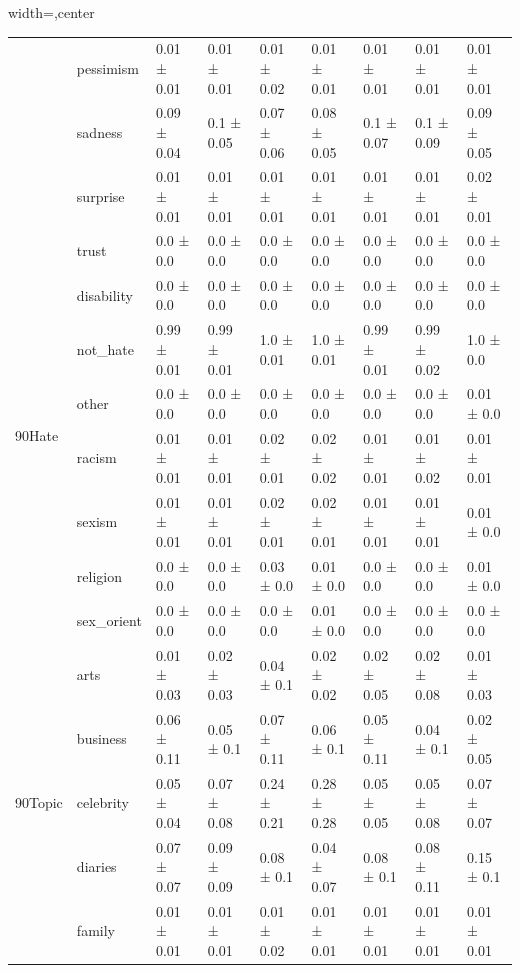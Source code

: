 \begin{table}
\begin{adjustbox}{width=\textwidth,center}
\begin{tabular}{llll|ll|ll|l}
 & pessimism & 0.01 ± 0.01 & 0.01 ± 0.01 & 0.01 ± 0.02 & 0.01 ± 0.01 & 0.01 ± 0.01 & 0.01 ± 0.01 & 0.01 ± 0.01 \\
 & sadness & 0.09 ± 0.04 & 0.1 ± 0.05 & 0.07 ± 0.06 & 0.08 ± 0.05 & 0.1 ± 0.07 & 0.1 ± 0.09 & 0.09 ± 0.05 \\
 & surprise & 0.01 ± 0.01 & 0.01 ± 0.01 & 0.01 ± 0.01 & 0.01 ± 0.01 & 0.01 ± 0.01 & 0.01 ± 0.01 & 0.02 ± 0.01 \\
 & trust & 0.0 ± 0.0 & 0.0 ± 0.0 & 0.0 ± 0.0 & 0.0 ± 0.0 & 0.0 ± 0.0 & 0.0 ± 0.0 & 0.0 ± 0.0 \\ \hline
\multirow{6}{*}{\begin{turn}{90}Hate\end{turn}} & disability & 0.0 ± 0.0 & 0.0 ± 0.0 & 0.0 ± 0.0 & 0.0 ± 0.0 & 0.0 ± 0.0 & 0.0 ± 0.0 & 0.0 ± 0.0 \\
 & not\_hate & 0.99 ± 0.01 & 0.99 ± 0.01 & 1.0 ± 0.01 & 1.0 ± 0.01 & 0.99 ± 0.01 & 0.99 ± 0.02 & 1.0 ± 0.0 \\
 & other & 0.0 ± 0.0 & 0.0 ± 0.0 & 0.0 ± 0.0 & 0.0 ± 0.0 & 0.0 ± 0.0 & 0.0 ± 0.0 & 0.01 ± 0.0 \\
 & racism & 0.01 ± 0.01 & 0.01 ± 0.01 & 0.02 ± 0.01 & 0.02 ± 0.02 & 0.01 ± 0.01 & 0.01 ± 0.02 & 0.01 ± 0.01 \\
 & sexism & 0.01 ± 0.01 & 0.01 ± 0.01 & 0.02 ± 0.01 & 0.02 ± 0.01 & 0.01 ± 0.01 & 0.01 ± 0.01 & 0.01 ± 0.0 \\
 & religion & 0.0 ± 0.0 & 0.0 ± 0.0 & 0.03 ± 0.0 & 0.01 ± 0.0 & 0.0 ± 0.0 & 0.0 ± 0.0 & 0.01 ± 0.0 \\
 & sex\_orient & 0.0 ± 0.0 & 0.0 ± 0.0 & 0.0 ± 0.0 & 0.01 ± 0.0 & 0.0 ± 0.0 & 0.0 ± 0.0 & 0.0 ± 0.0 \\ \hline
\multirow{19}{*}{\begin{turn}{90}Topic\end{turn}} & arts & 0.01 ± 0.03 & 0.02 ± 0.03 & 0.04 ± 0.1 & 0.02 ± 0.02 & 0.02 ± 0.05 & 0.02 ± 0.08 & 0.01 ± 0.03 \\
 & business & 0.06 ± 0.11 & 0.05 ± 0.1 & 0.07 ± 0.11 & 0.06 ± 0.1 & 0.05 ± 0.11 & 0.04 ± 0.1 & 0.02 ± 0.05 \\
 & celebrity & 0.05 ± 0.04 & 0.07 ± 0.08 & 0.24 ± 0.21 & 0.28 ± 0.28 & 0.05 ± 0.05 & 0.05 ± 0.08 & 0.07 ± 0.07 \\
 & diaries & 0.07 ± 0.07 & 0.09 ± 0.09 & 0.08 ± 0.1 & 0.04 ± 0.07 & 0.08 ± 0.1 & 0.08 ± 0.11 & 0.15 ± 0.1 \\
 & family & 0.01 ± 0.01 & 0.01 ± 0.01 & 0.01 ± 0.02 & 0.01 ± 0.01 & 0.01 ± 0.01 & 0.01 ± 0.01 & 0.01 ± 0.01 \\

\end{tabular}
\end{adjustbox}
\end{table}
